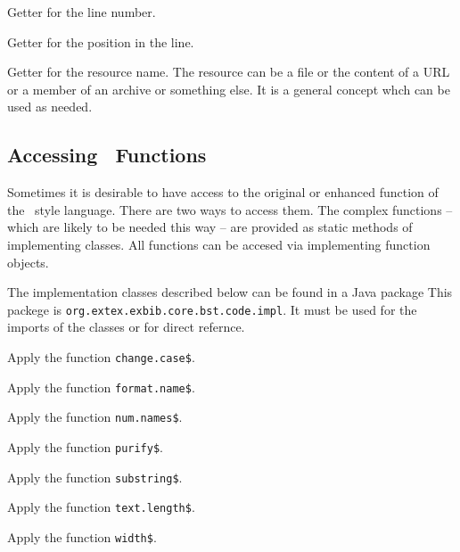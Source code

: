 \begin{methods}

    Getter for the line number.

    Getter for the position in the line.

    Getter for the resource name. The resource can be a file or the content of
    a URL or a member of an archive or something else. It is a general concept
    whch can be used as needed.

\end{methods}


\subsection{Accessing \BibTeX\ Functions}

Sometimes it is desirable to have access to the original or enhanced
function of the \BibTeX\ style language. There are two ways to access
them. The complex functions -- which are likely to be needed this way
-- are provided as static methods of implementing classes. All
functions can be accesed via implementing function objects.

The implementation classes described below can be found in a Java
package This packege is \texttt{org.extex.exbib.core.bst.code.impl}.
It must be used for the imports of the classes or for direct refernce.

\begin{methods}

  Apply the function \texttt{change.case\$}.

  Apply the function \texttt{format.name\$}.

  Apply the function \texttt{num.names\$}.

  Apply the function \texttt{purify\$}.

  Apply the function \texttt{substring\$}.

  Apply the function \texttt{text.length\$}.

  Apply the function \texttt{width\$}.

\end{methods}
\endinput%
%

